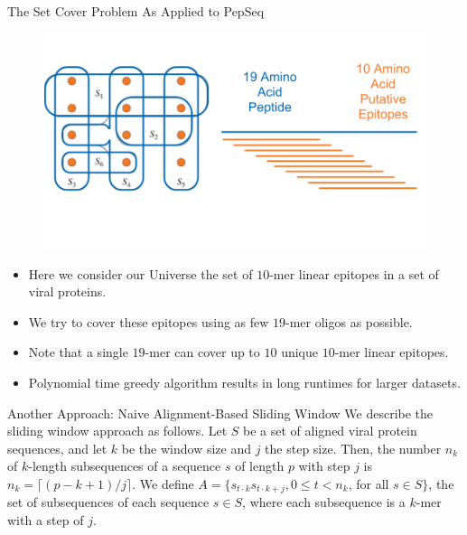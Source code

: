 \documentclass[final]{beamer}
\newlength{\colwidth}
\begin{document}
\begin{frame}[t]
\begin{columns}[t]
\begin{column}{\colwidth}
\begin{block}{The Set Cover Problem As Applied to PepSeq}
    \begin{figure}
      \includegraphics[width=0.7\colwidth]{figures/set_cover_oligo.png}
      \label{fig:library}
    \end{figure}
    \begin{itemize}
      \item Here we consider our Universe the set of $10$-mer linear epitopes in a set of viral proteins.
      \item We try to cover these epitopes using as few $19$-mer oligos as possible.
      \item Note that a single $19$-mer can cover up to $10$ unique $10$-mer linear epitopes.
      \item Polynomial time greedy algorithm results in long runtimes for larger datasets.
    \end{itemize}


\end{block}

\begin{block}{Another Approach: Naive Alignment-Based Sliding Window}
  We describe the sliding window approach as follows.
  Let $S$ be a set of aligned viral protein sequences, and let $k$ be the window size and $j$ the step size.
  Then, the number $n_k$ of $k$-length subsequences of a sequence $s$ of length $p$ with step $j$ is $n_k = \lceil(p - k + 1 )/j\rceil$.
  We define $A = \{ s_{t\cdot k }s_{t\cdot k + j}, 0 \leq t < n_k$, for all $s \in S \}$, the set of subsequences of each sequence
  $s\in S$, where each subsequence is a $k$-mer with a step of $j$.


\end{block}
\end{column}
\end{columns}
\end{frame}
\end{document}
